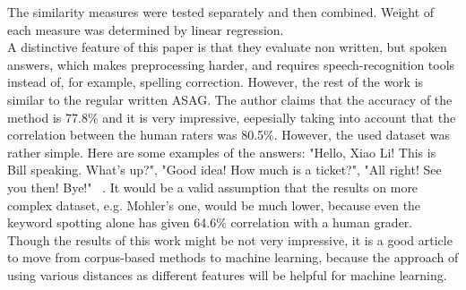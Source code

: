 The similarity measures were tested separately and then combined. Weight of each measure was determined by linear regression.\\

A distinctive feature of this paper is that they evaluate non written, but spoken answers, which makes preprocessing harder, and requires speech-recognition tools instead of, for example, spelling correction. However, the rest of the work is similar to the regular written ASAG. The author claims that the accuracy of the method is 77.8\% and it is very impressive, eepesially taking into account that the correlation between the human raters was 80.5\%. However, the used dataset was rather simple. Here are some examples of the answers: "Hello, Xiao Li! This is Bill speaking. What's up?", "Good idea! How much is a ticket?", "All right! See you then! Bye!" ~\cite{Li}. It would be a valid assumption that the results on more complex dataset, e.g. Mohler's one, would be much lower, because even the keyword spotting alone has given 64.6\% correlation with a human grader. Though the results of this work might be not very impressive, it is a good article to move from corpus-based methods to machine learning, because the approach of using various distances as different features will be helpful for machine learning.\\

